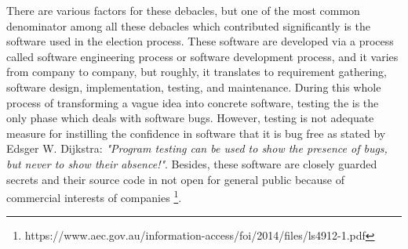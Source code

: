    There are various factors for these debacles, but one of the most 
   common denominator among all these debacles
   which contributed significantly  is the software used in the election process. 
   These software are developed via a process called software engineering process 
   or software development process, and it varies from company to company, 
   but  roughly, it translates to  requirement 
   gathering, software design, implementation, testing, and maintenance. 
   During this whole process of transforming a vague idea into 
   concrete software, testing the is the only phase which deals 
   with software bugs. However, testing is not adequate measure
   for instilling the confidence in software that it is bug free 
   as stated by Edsger W. Dijkstra:
   \textit{ "Program testing can be used to show the presence of bugs, 
    but never to show their absence!"}. Besides, these software 
    are closely guarded secrets and their source 
   code in not open for general public because of commercial 
   interests of companies 
   \footnote{https://www.aec.gov.au/information-access/foi/2014/files/ls4912-1.pdf}.
   
